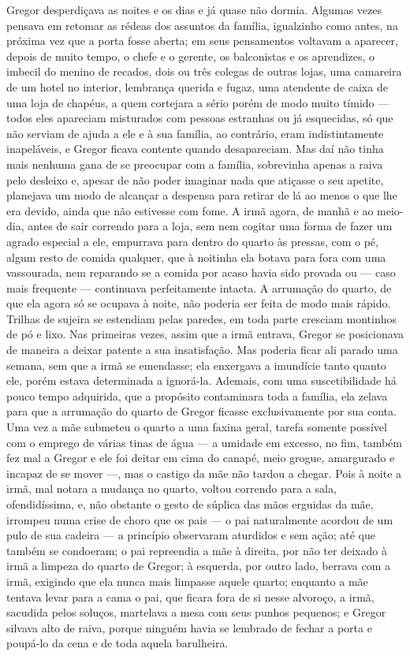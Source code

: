 Gregor desperdiçava as noites e os dias e já quase não dormia. Algumas
vezes pensava em retomar as rédeas dos assuntos da família, igualzinho
como antes, na próxima vez que a porta fosse aberta; em seus pensamentos
voltavam a aparecer, depois de muito tempo, o chefe e o gerente, os
balconistas e os aprendizes, o imbecil do menino de recados, dois ou três
colegas de outras lojas, uma camareira de um hotel no interior,
lembrança querida e fugaz, uma atendente de caixa de uma loja de chapéus,
a quem cortejara a sério porém de modo muito tímido --- todos eles apareciam
misturados com pessoas estranhas ou já esquecidas, só que não serviam de
ajuda a ele e à sua família, ao contrário, eram indistintamente
inapeláveis, e Gregor ficava contente quando desapareciam. Mas daí não
tinha mais nenhuma gana de se preocupar com a família, sobrevinha apenas a
raiva pelo desleixo e, apesar de não poder imaginar nada que atiçasse o
seu apetite, planejava um modo de alcançar a despensa para retirar de lá
ao menos o que lhe era devido, ainda que não estivesse com fome. A irmã
agora, de manhã e ao meio-dia, antes de sair correndo para a loja, sem nem
cogitar uma forma de fazer um agrado especial a ele, empurrava para dentro
do quarto às pressas, com o pé, algum resto de comida qualquer, que à
noitinha ela botava para fora com uma vassourada, nem reparando se a
comida por acaso havia sido provada ou --- caso mais frequente --- continuava
perfeitamente intacta. A arrumação do quarto, de que ela agora só se
ocupava à noite, não poderia ser feita de modo mais rápido. Trilhas de
sujeira se estendiam pelas paredes, em toda parte cresciam montinhos de pó
e lixo. Nas primeiras vezes, assim que a irmã entrava, Gregor se
posicionava de maneira a deixar patente a sua insatisfação. Mas poderia ficar ali parado uma
semana, sem que a irmã se emendasse; ela enxergava a imundície tanto
quanto ele, porém estava determinada a ignorá-la. Ademais, com uma
suscetibilidade há pouco tempo adquirida, que a propósito contaminara toda
a família, ela zelava para que a arrumação do quarto de Gregor ficasse
exclusivamente por sua conta. Uma vez a mãe submeteu o quarto a uma faxina
geral, tarefa somente possível com o emprego de várias tinas de
água --- a umidade em excesso, no fim, também fez mal a Gregor e ele foi
deitar em cima do canapé, meio grogue, amargurado e incapaz de se mover ---,
mas o castigo da mãe não tardou a chegar. Pois à noite a irmã, mal notara
a mudança no quarto, voltou correndo para a sala, ofendidíssima, e, não
obstante o gesto de súplica das mãos erguidas da mãe, irrompeu numa crise
de choro que os pais --- o pai naturalmente acordou de um pulo de sua
cadeira --- a princípio observaram aturdidos e sem ação; até que também se
condoeram; o pai repreendia a mãe à direita, por não ter deixado à irmã a
limpeza do quarto de Gregor; à esquerda, por outro lado, berrava com a
irmã, exigindo que ela nunca mais limpasse aquele quarto; enquanto a mãe
tentava levar para a cama o pai, que ficara fora de si nesse alvoroço, a
irmã, sacudida pelos soluços, martelava a mesa com seus punhos pequenos; e
Gregor silvava alto de raiva, porque ninguém havia se lembrado de fechar a
porta e poupá-lo da cena e de toda aquela barulheira.

